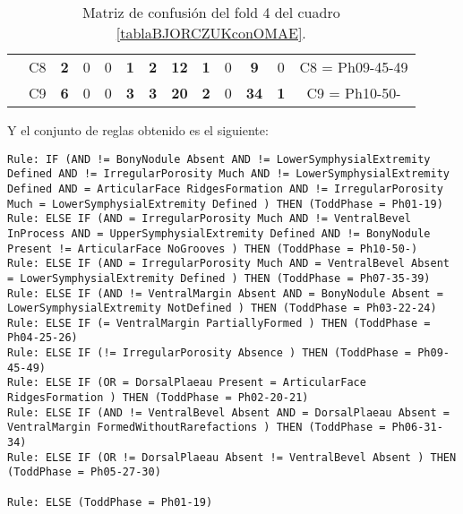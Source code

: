 \begin{table}[H]
{\begin{tabular}{|ccccccccccccc|}
\multicolumn{1}{|c|}{}                                      & \multicolumn{1}{c|}{C8} & \multicolumn{1}{c|}{\textbf{2}} & \multicolumn{1}{c|}{0}          & \multicolumn{1}{c|}{0}          & \multicolumn{1}{c|}{\textbf{1}} & \multicolumn{1}{c|}{\textbf{2}} & \multicolumn{1}{c|}{\textbf{12}} & \multicolumn{1}{c|}{\textbf{1}} & \multicolumn{1}{c|}{0}  & \multicolumn{1}{c|}{\textbf{9}}  & \multicolumn{1}{c|}{0}          & C8 = Ph09-45-49   \\ \cline{2-13}
\multicolumn{1}{|c|}{}                                      & \multicolumn{1}{c|}{C9} & \multicolumn{1}{c|}{\textbf{6}} & \multicolumn{1}{c|}{0}          & \multicolumn{1}{c|}{0}          & \multicolumn{1}{c|}{\textbf{3}} & \multicolumn{1}{c|}{\textbf{3}} & \multicolumn{1}{c|}{\textbf{20}} & \multicolumn{1}{c|}{\textbf{2}} & \multicolumn{1}{c|}{0}  & \multicolumn{1}{c|}{\textbf{34}} & \multicolumn{1}{c|}{\textbf{1}} & C9 = Ph10-50-     \\ \hline
\end{tabular}%
}
\caption{Matriz de confusión del fold 4 del cuadro \ref{tablaBJORCZUKconOMAE}.}
\end{table}

\newpage

Y el conjunto de reglas obtenido es el siguiente:

\begin{lstlisting}
Rule: IF (AND != BonyNodule Absent AND != LowerSymphysialExtremity Defined AND != IrregularPorosity Much AND != LowerSymphysialExtremity Defined AND = ArticularFace RidgesFormation AND != IrregularPorosity Much = LowerSymphysialExtremity Defined ) THEN (ToddPhase = Ph01-19)
Rule: ELSE IF (AND = IrregularPorosity Much AND != VentralBevel InProcess AND = UpperSymphysialExtremity Defined AND != BonyNodule Present != ArticularFace NoGrooves ) THEN (ToddPhase = Ph10-50-)
Rule: ELSE IF (AND = IrregularPorosity Much AND = VentralBevel Absent = LowerSymphysialExtremity Defined ) THEN (ToddPhase = Ph07-35-39)
Rule: ELSE IF (AND != VentralMargin Absent AND = BonyNodule Absent = LowerSymphysialExtremity NotDefined ) THEN (ToddPhase = Ph03-22-24)
Rule: ELSE IF (= VentralMargin PartiallyFormed ) THEN (ToddPhase = Ph04-25-26)
Rule: ELSE IF (!= IrregularPorosity Absence ) THEN (ToddPhase = Ph09-45-49)
Rule: ELSE IF (OR = DorsalPlaeau Present = ArticularFace RidgesFormation ) THEN (ToddPhase = Ph02-20-21)
Rule: ELSE IF (AND != VentralBevel Absent AND = DorsalPlaeau Absent = VentralMargin FormedWithoutRarefactions ) THEN (ToddPhase = Ph06-31-34)
Rule: ELSE IF (OR != DorsalPlaeau Absent != VentralBevel Absent ) THEN (ToddPhase = Ph05-27-30)

Rule: ELSE (ToddPhase = Ph01-19)
\end{lstlisting}

